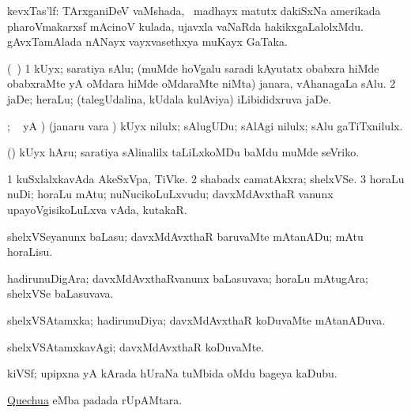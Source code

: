 \bentry
{}
\gl{\nA}
\bmng
kevxTas'lf: 
\banum
{} TArxganiDeV vaMshada, \kanmu\ madhayx matutx dakiSxNa amerikada pharoVmakarxsf mAcinoV kulada, ujavxla vaNaRda hakikxgaLalolxMdu.  
 gAvxTamAlada nANayx vayxvasethxya muKayx GaTaka. 
\eanum
\emng
\eentry

\bentry
{}
\gl{\nA}
\bmng
(\kanmu\ \birx) 
\bnum
\num{1} kUyx; saratiya sAlu; (muMde hoVgalu saradi kAyutatx obabxra hiMde obabxraMte yA oMdara hiMde oMdaraMte niMta) janara, vAhanagaLa sAlu. 
\num{2} jaDe; heraLu; (talegUdalina, kUdala kulAviya) iLibididxruva jaDe. 
\enum
\emng
\eentry

\bentry
{}
\gl{\akirx}
; \vakaq\  yA )\bmng
(janaru \mo vara \vi) kUyx nilulx; sAlugUDu; sAlAgi nilulx; sAlu gaTiTxnilulx. 
\emng
\eentry

\bentry
{}
\gl{\akirx}
\bmng
(\birx) kUyx hAru; saratiya sAlinalilx taLiLxkoMDu baMdu muMde seVriko. 
\emng
\eentry


\bentry
{}
\gl{\nA}
\bmng
\bnum
\num{1} kuSxlalxkavAda AkeSxVpa, TiVke. 
\num{2} shabadx camatAkxra; shelxVSe. 
\num{3} horaLu nuDi; horaLu mAtu; nuNucikoLuLxvudu; davxMdAvxthaR \mo vanunx upayoVgisikoLuLxva vAda, kutakaR. 
\enum
\emng
\eentry

\bentry
{}
\gl{\akirx}
\bmng
shelxVSeyanunx baLasu; davxMdAvxthaR baruvaMte mAtanADu; mAtu horaLisu. 
\emng
\eentry

\bentry
{}
\gl{\nA}
\bmng
hadirunuDigAra; davxMdAvxthaRvanunx baLasuvava; horaLu mAtugAra; shelxVSe baLasuvava. 
\emng
\eentry

\bentry
{}
\gl{\gu}
\bmng
shelxVSAtamxka; hadirunuDiya; davxMdAvxthaR koDuvaMte mAtanADuva. 
\emng
\eentry

\bentry
{}
\gl{\kirxvi}
\bmng
shelxVSAtamxkavAgi; davxMdAvxthaR koDuvaMte. 
\emng
\eentry

\bentry
{}
\gl{\nA}
\bmng
kiVSf; upipxna yA kArada hUraNa tuMbida oMdu bageya kaDubu. 
\emng
\eentry

\bentry
{}
\gl{\nA}
\bmng
\hyperlink{Quechua}{Quechua} eMba padada rUpAMtara. 
\emng
\eentry

